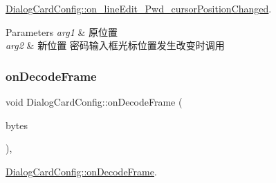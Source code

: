 \mbox{\hyperlink{class_dialog_card_config_a9f395a60ba0f64df7eb1543c2750c868}{Dialog\+Card\+Config\+::on\+\_\+line\+Edit\+\_\+\+Pwd\+\_\+cursor\+Position\+Changed}}. 


\begin{DoxyParams}{Parameters}
{\em arg1} & 原位置 \\
\hline
{\em arg2} & 新位置 密码输入框光标位置发生改变时调用 \\
\hline
\end{DoxyParams}
\mbox{\label{class_dialog_card_config_aed468b0bda0695d288795c0d8ef32dd8}} 
\subsubsection{\texorpdfstring{onDecodeFrame}{onDecodeFrame}}
{\footnotesize\ttfamily void Dialog\+Card\+Config\+::on\+Decode\+Frame (\begin{DoxyParamCaption}\item[{Q\+Byte\+Array}]{bytes }\end{DoxyParamCaption})\hspace{0.3cm}{\ttfamily [private]}, {\ttfamily [slot]}}



\mbox{\hyperlink{class_dialog_card_config_aed468b0bda0695d288795c0d8ef32dd8}{Dialog\+Card\+Config\+::on\+Decode\+Frame}}. 


